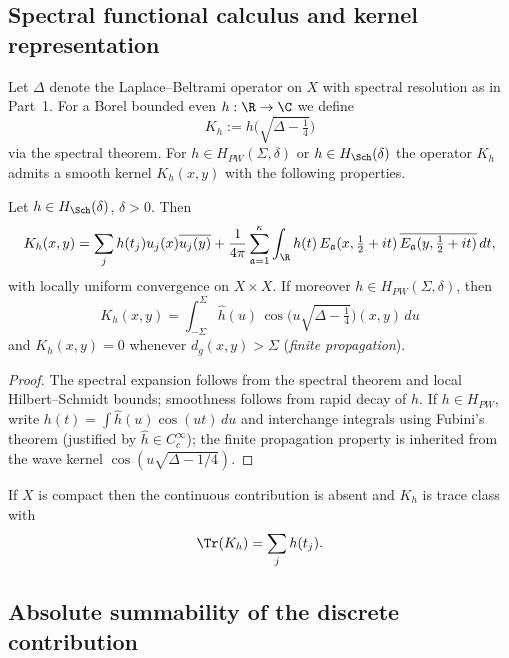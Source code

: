 \subsection{Spectral functional calculus and kernel representation}
\label{subsec:functional-calculus-kernel}

Let $\Delta$ denote the Laplace–Beltrami operator on $X$ with spectral resolution as in Part~1. For a Borel bounded even $h:\R\to\C$ we define
\[
  K_h := h\!\big(\sqrt{\Delta-\tfrac14}\big)
\]
via the spectral theorem. For $h\in H_{PW}(\Sigma,\delta)$ or $h\in H_{\Sch}(\delta)$ the operator $K_h$ admits a smooth kernel $K_h(x,y)$ with the following properties.

\begin{proposition}
\label{prop:kernel-expansion}
Let $h\in H_{\Sch}(\delta)$, $\delta>0$. Then
\[
  K_h(x,y)
  = \sum_j h(t_j)u_j(x)\overline{u_j(y)}
    + \frac{1}{4\pi}\sum_{\mathfrak a=1}^{\kappa}\int_{\R}
         h(t)\,E_{\mathfrak a}(x,\tfrac12+it)\,\overline{E_{\mathfrak a}(y,\tfrac12+it)}\,dt,
\]
with locally uniform convergence on $X\times X$. If moreover $h\in H_{PW}(\Sigma,\delta)$, then
\[
  K_h(x,y) = \int_{-\Sigma}^{\Sigma} \widehat h(u)\, \cos\!\Big(u\sqrt{\Delta-\tfrac14}\Big)(x,y)\,du
\]
and $K_h(x,y)=0$ whenever $d_g(x,y)>\Sigma$ (\emph{finite propagation}).
\end{proposition}

\begin{proof}
The spectral expansion follows from the spectral theorem and local Hilbert–Schmidt bounds; smoothness follows from rapid decay of $h$. If $h\in H_{PW}$, write $h(t)=\int \widehat h(u)\cos(ut)\,du$ and interchange integrals using Fubini's theorem (justified by $\widehat h\in C_c^\infty$); the finite propagation property is inherited from the wave kernel $\cos(u\sqrt{\Delta-1/4})$.
\end{proof}

\begin{remark}
If $X$ is compact then the continuous contribution is absent and $K_h$ is trace class with
\[
  \Tr(K_h)=\sum_j h(t_j).
\]
\end{remark}

\subsection{Absolute summability of the discrete contribution}
\label{subsec:absolute-sum-discrete}

